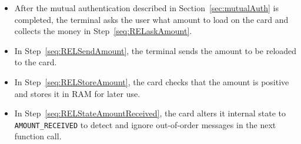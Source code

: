 \documentclass{article}
\begin{document}
\begin{itemize}
%
%
%
%
%

    \item After the mutual authentication described in Section~\ref{sec:mutualAuth} is completed, the terminal asks the user what amount to load on the card and collects the money in Step~\ref{seq:RELaskAmount}.
    \item In Step~\ref{seq:RELSendAmount}, the terminal sends the amount to be reloaded to the card.
    \item In Step~\ref{seq:RELStoreAmount}, the card checks that the amount is positive and stores it in RAM for later use.
    \item In Step~\ref{seq:RELStateAmountReceived}, the card alters it internal state to \texttt{AMOUNT\_RECEIVED} to detect and ignore out-of-order messages in the next function call.


\end{itemize}
\end{document}
